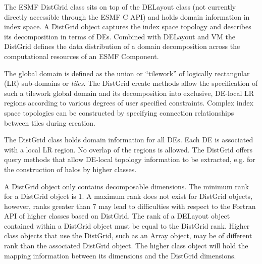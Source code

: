 %


\label{sec:DistGrid}
The ESMF DistGrid class sits on top of the DELayout class (not currently
directly accessible through the ESMF C API) and holds domain
information in index space. 
A DistGrid object captures the index space topology
and describes its decomposition in terms of DEs. Combined with DELayout and VM
the DistGrid defines the data distribution of a domain decomposition across the
computational resources of an ESMF Component.

The global domain is defined as the union or ``tilework'' of logically
rectangular (LR) sub-domains or {\em tiles}. The DistGrid create methods allow
the specification of such a tilework global domain and its decomposition into
exclusive, DE-local LR regions according to various degrees of user specified
constraints. Complex index space topologies can be constructed by specifying
connection relationships between tiles during creation.

The DistGrid class holds domain information for all DEs. Each DE is associated
with a local LR region. No overlap of the regions is allowed. The DistGrid
offers query methods that allow DE-local topology information to be extracted,
e.g. for the construction of halos by higher classes.

A DistGrid object only contains decomposable dimensions. The minimum rank for a
DistGrid object is 1. A maximum rank does not exist for DistGrid objects, 
however, ranks greater than 7 may lead to difficulties with respect to the
Fortran API of higher classes based on DistGrid. The rank of a DELayout object
contained within a DistGrid object must be equal to the DistGrid rank. Higher
class objects that use the DistGrid, such as an Array object, may be of
different rank than the associated DistGrid object. The higher class object
will hold the mapping information between its dimensions and the DistGrid
dimensions.

